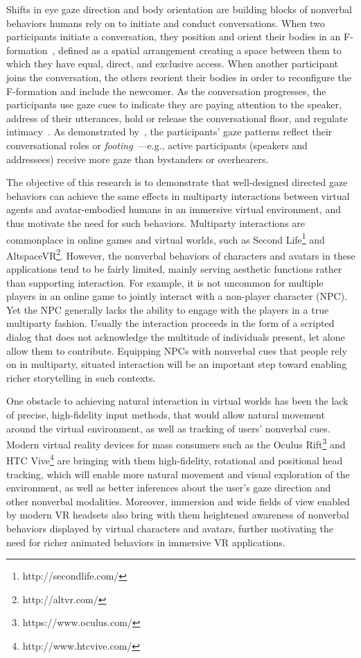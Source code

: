 Shifts in eye gaze direction and body orientation are building blocks of nonverbal behaviors humans rely on to initiate and conduct conversations. When two participants initiate a conversation, they position and orient their bodies in an F-formation~\citep{kendon1990conducting}, defined as a spatial arrangement creating a space between them to which they have equal, direct, and exclusive access. When another participant joins the conversation, the others reorient their bodies in order to reconfigure the F-formation and include the newcomer. As the conversation progresses, the participants use gaze cues to indicate they are paying attention to the speaker, address of their utterances, hold or release the conversational floor, and regulate intimacy~\citep{heylen2006head}. As demonstrated by~\citet{mutlu2012conversational}, the participants' gaze patterns reflect their conversational roles or \emph{footing}~\citep{goffman1979footing}---e.g., active participants (speakers and addressees) receive more gaze than bystanders or overhearers.

The objective of this research is to demonstrate that well-designed directed gaze behaviors can achieve the same effects in multiparty interactions between virtual agents and avatar-embodied humans in an immersive virtual environment, and thus motivate the need for such behaviors. Multiparty interactions are commonplace in online games and virtual worlds, such as Second Life\footnote{http://secondlife.com/} and AltspaceVR\footnote{http://altvr.com/}. However, the nonverbal behaviors of characters and avatars in these applications tend to be fairly limited, mainly serving aesthetic functions rather than supporting interaction.
For example, it is not uncommon for multiple players in an online game to jointly interact with a non-player character (NPC). Yet the NPC generally lacks the ability to engage with the players in a true multiparty fashion. Usually the interaction proceeds in the form of a scripted dialog that does not acknowledge the multitude of individuals present, let alone allow them to contribute. Equipping NPCs with nonverbal cues that people rely on in multiparty, situated interaction will be an important step toward enabling richer storytelling in such contexts.

One obstacle to achieving natural interaction in virtual worlds has been the lack of precise, high-fidelity input methods, that would allow natural movement around the virtual environment, as well as tracking of users' nonverbal cues. Modern virtual reality devices for mass consumers such as the Oculus Rift\footnote{https://www.oculus.com/} and HTC Vive\footnote{http://www.htcvive.com/} are bringing with them high-fidelity, rotational and positional head tracking, which will enable more natural movement and visual exploration of the environment, as well as better inferences about the user's gaze direction and other nonverbal modalities. Moreover, immersion and wide fields of view enabled by modern VR headsets also bring with them heightened awareness of nonverbal behaviors displayed by virtual characters and avatars, further motivating the need for richer animated behaviors in immersive VR applications.

